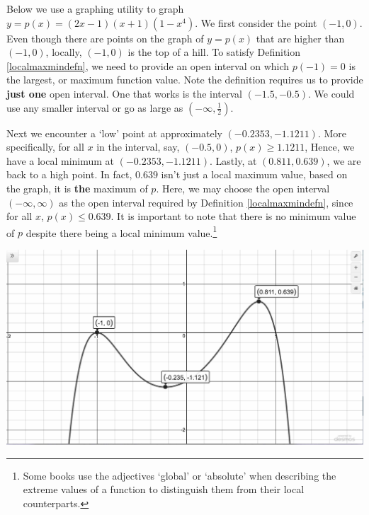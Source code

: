 \documentclass{ximera}
\begin{document}
\medskip

Below we use a graphing utility to graph $y= p(x) = (2x-1)(x+1)(1-x^4)$.    We first consider the point $(-1,0)$.   Even though there are points on the graph of $y = p(x)$ that are higher than $(-1,0)$,  locally, $(-1,0)$ is the top of a hill.  To satisfy Definition \ref{localmaxmindefn}, we need to provide an open interval on which $p(-1) = 0$ is the largest, or maximum function value. Note the definition requires us to provide \textbf{just one} open interval.  One that works is the interval $(-1.5, -0.5)$.   We could use any smaller interval or go as large as $\left(-\infty, \frac{1}{2} \right)$. 

\medskip

Next we encounter  a `low' point at approximately $(-0.2353, -1.1211)$. More specifically, for all $x$ in the interval, say,  $(-0.5, 0)$, $p(x) \geq 1.1211$,  Hence, we have a local minimum at $(-0.2353, -1.1211)$.   Lastly, at $(0.811, 0.639)$, we are back to a high point.  In fact, $0.639$ isn't just a local maximum value, based on the graph, it is \textbf{the} maximum of $p$.  Here, we may choose the open interval $(-\infty, \infty)$ as the open interval required by Definition \ref{localmaxmindefn}, since for all $x$, $p(x) \leq 0.639$.   It is important to note that there is no minimum value of $p$ despite there being a local minimum value.\footnote{Some books use the adjectives `global' or `absolute' when describing the extreme values of a function to distinguish them from their local counterparts.} 

\begin{center}

\label{localmaxminexample}

\includegraphics[width=6in]{./GraphsofPolynomialsGraphics/PolyRelativeExtrema.jpg} 

\end{center}
\end{document}

